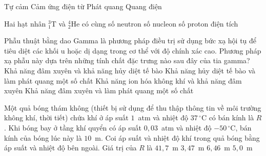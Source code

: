 \begin{ex}
\begin{center}
		\end{center}
		\choice
		{Tự cảm}
		{\True Cảm ứng điện từ}
		{Phát quang}
		{Quang điện}
	\end{ex}

	\begin{ex}%
		Hai hạt nhân ${}^3_1\text{T}$ và ${}^4_2\text{He}$ có cùng
		\choice
		{\True số neutron}
		{số nucleon}
		{số proton}
		{điện tích}
	\end{ex}

	\begin{ex}%
		Phẫu thuật bằng dao Gamma là phương pháp điều trị sử dụng bức xạ hội tụ để tiêu diệt các khối u hoặc dị dạng trong cơ thể với độ chính xác cao. Phương pháp xạ phẫu này dựa trên những tính chất đặc trưng nào sau đây của tia gamma?
		\choice
		{\True Khả năng đâm xuyên và khả năng hủy diệt tế bào}
		{Khả năng hủy diệt tế bào và làm phát quang một số chất}
		{Khả năng ion hóa không khí và khả năng đâm xuyên}
		{Khả năng đâm xuyên và làm phát quang một số chất}
	\end{ex}

	\begin{ex}%
		Một quả bóng thám không (thiết bị sử dụng để thu thập thông tin về môi trường không khí, thời tiết) chứa khí ở áp suất $1$~atm và nhiệt độ $37\,^\circ\text{C}$ có bán kính là $R$. Khi bóng bay ở tầng khí quyển có áp suất $0{,}03$~atm và nhiệt độ $-50\,^\circ\text{C}$, bán kính của bóng lúc này là $10$~m. Coi áp suất và nhiệt độ khí trong quả bóng bằng áp suất và nhiệt độ bên ngoài. Giá trị của $R$ là
		\choice
		{$41{,}7$~m}
		{\True $3{,}47$~m}
		{$6{,}46$~m}
		{$5{,}0$~m}
	\end{ex}


